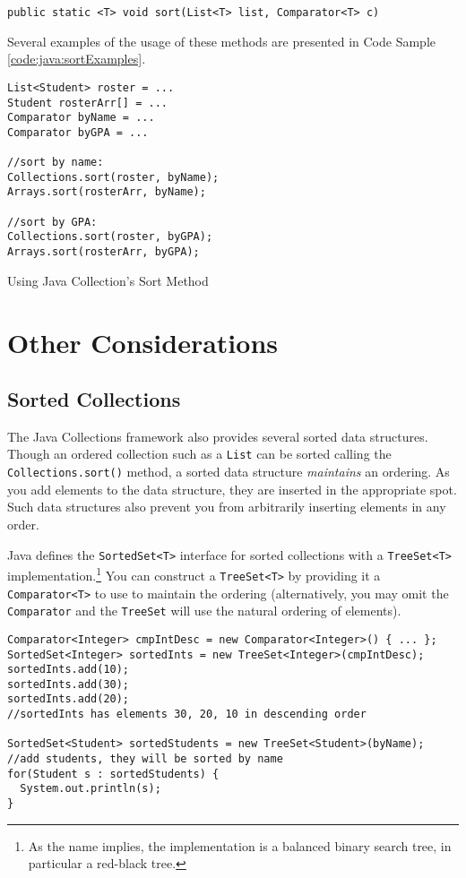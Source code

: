 \texttt{public static <T> void sort(List<T> list, Comparator<T> c)}

Several examples of the usage of these methods are presented in Code
Sample \ref{code:java:sortExamples}.

\begin{listing}[!h]
\begin{verbatim}
List<Student> roster = ...
Student rosterArr[] = ...
Comparator byName = ...
Comparator byGPA = ...

//sort by name:
Collections.sort(roster, byName);
Arrays.sort(rosterArr, byName);

//sort by GPA:
Collections.sort(roster, byGPA);
Arrays.sort(rosterArr, byGPA);
\end{verbatim}
\caption{Using Java Collection's Sort Method}
\label{code:java:sortExamples}
\end{listing}

\section{Other Considerations}

\subsection{Sorted Collections}

The Java Collections framework also provides several sorted data structures.
Though an ordered collection such as a \texttt{List} can be sorted
calling the \texttt{Collections.sort()} method, a sorted data
structure \emph{maintains} an ordering.  As you add elements to 
the data structure, they are inserted in the appropriate spot.  Such data 
structures also prevent you from arbitrarily inserting elements in any 
order.  

Java defines the \texttt{SortedSet<T>} interface for sorted 
collections with a \texttt{TreeSet<T>} implementation.\footnote{As 
the name implies, the implementation is a balanced binary
search tree, in particular a red-black tree.}  You can construct a
\texttt{TreeSet<T>} by providing it a \texttt{Comparator<T>}
to use to maintain the ordering (alternatively, you may omit the
\texttt{Comparator} and the \texttt{TreeSet} will
use the natural ordering of elements).

\begin{verbatim}
Comparator<Integer> cmpIntDesc = new Comparator<Integer>() { ... };
SortedSet<Integer> sortedInts = new TreeSet<Integer>(cmpIntDesc);
sortedInts.add(10);
sortedInts.add(30);
sortedInts.add(20);
//sortedInts has elements 30, 20, 10 in descending order

SortedSet<Student> sortedStudents = new TreeSet<Student>(byName);
//add students, they will be sorted by name
for(Student s : sortedStudents) {
  System.out.println(s);
}
\end{verbatim}

